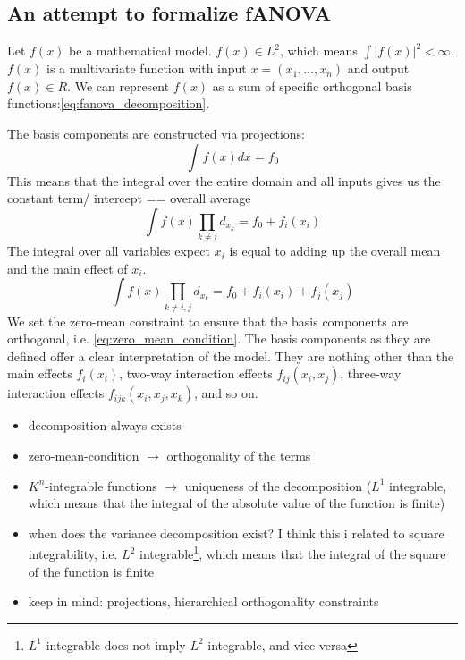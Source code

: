 \subsection*{An attempt to formalize fANOVA}
Let $f(x)$ be a mathematical model. $f(x) \in L^2$, which means $\int|f(x)|^2 < \infty$. $f(x)$ is a multivariate function with input $x = (x_1,\dots, x_n)$ and output $f(x) \in R$. We can represent $f(x)$ as a sum of specific orthogonal basis functions:\autoref{eq:fanova_decomposition}.\par
The basis components are constructed via projections:
\begin{equation}
    \int f(x) dx = f_0
\end{equation}
This means that the integral over the entire domain and all inputs gives us the constant term/ intercept == overall average
\begin{equation}
    \int f(x) \prod_{k \neq i} d_{x_{k}} = f_0 + f_i(x_i)
\end{equation}
The integral over all variables expect $x_i$ is equal to adding up the overall mean and the main effect of $x_i$.
\begin{equation}
    \int f(x) \prod_{k \neq i,j} d_{x_{k}} = f_0 + f_i(x_i) + f_j(x_j)
\end{equation}
We set the zero-mean constraint to ensure that the basis components are orthogonal, i.e. \autoref{eq:zero_mean_condition}.
The basis components as they are defined offer a clear interpretation of the model. They are nothing other than the main effects $f_i(x_i)$, two-way interaction effects $f_{ij}(x_i,x_j)$, three-way interaction effects $f_{ijk}(x_i,x_j,x_k)$, and so on.


\begin{itemize}
    \item decomposition always exists
    \item zero-mean-condition $\rightarrow$ orthogonality of the terms
    \item $K^n$-integrable functions $\rightarrow$ uniqueness of the decomposition ($L^1$ integrable, which means that the integral of the absolute value of the function is finite)
    \item when does the variance decomposition exist? I think this i related to square integrability, i.e. $L^2$ integrable\footnote{$L^1$ integrable does not imply $L^2$ integrable, and vice versa}, which means that the integral of the square of the function is finite
    \item keep in mind: projections, hierarchical orthogonality constraints
\end{itemize}



